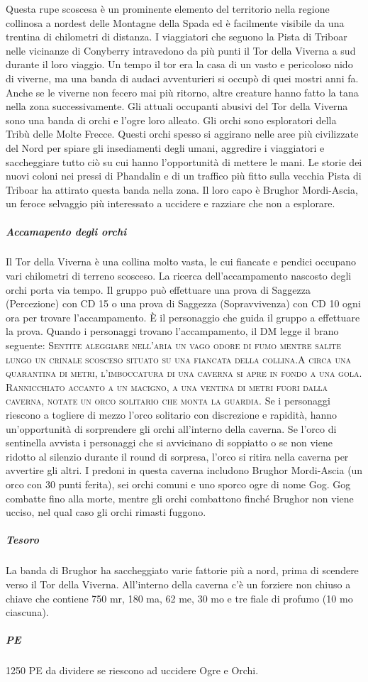 \documentclass{article}
\begin{document}
Questa rupe scoscesa è un prominente elemento del territorio
nella regione collinosa a nordest delle Montagne della Spada
ed è facilmente visibile da una trentina di chilometri di
distanza. I viaggiatori che seguono la Pista di Triboar nelle
vicinanze di Conyberry intravedono da più punti il Tor della
Viverna a sud durante il loro viaggio. Un tempo il tor era la
casa di un vasto e pericoloso nido di viverne, ma una banda
di audaci avventurieri si occupò di quei mostri anni fa. Anche
se le viverne non fecero mai più ritorno, altre creature hanno
fatto la tana nella zona successivamente. Gli attuali occupanti
abusivi del Tor della Viverna sono una banda di orchi e l’ogre
loro alleato.
Gli orchi sono esploratori della Tribù delle Molte Frecce.
Questi orchi spesso si aggirano nelle aree più civilizzate del
Nord per spiare gli insediamenti degli umani, aggredire i
viaggiatori e saccheggiare tutto ciò su cui hanno l'opportunità
di mettere le mani. Le storie dei nuovi coloni nei pressi di
Phandalin e di un traffico più fitto sulla vecchia Pista di
Triboar ha attirato questa banda nella zona. Il loro capo è
Brughor Mordi-Ascia, un feroce selvaggio più interessato a
uccidere e razziare che non a esplorare.

\subparagraph{Accamapento degli orchi}
Il Tor della Viverna è una collina molto vasta, le cui
fiancate e pendici occupano vari chilometri di terreno scosceso. La ricerca dell’accampamento nascosto degli
orchi porta via tempo. Il gruppo può effettuare una prova
di Saggezza (Percezione) con CD 15 o una prova di
Saggezza (Sopravvivenza) con CD 10 ogni ora per trovare
l'accampamento. È il personaggio che guida il gruppo a
effettuare la prova.
Quando i personaggi trovano l'accampamento, il DM legge
il brano seguente: \textsc{Sentite aleggiare nell’aria un vago odore di fumo mentre
salite lungo un crinale scosceso situato su una fiancata della
collina.A circa una quarantina di metri, l’imboccatura di una
caverna si apre in fondo a una gola. Rannicchiato accanto a un
macigno, a una ventina di metri fuori dalla caverna, notate un
orco solitario che monta la guardia.} 
Se i personaggi riescono a togliere di mezzo l'orco solitario
con discrezione e rapidità, hanno un'opportunità di
sorprendere gli orchi all'interno della caverna. Se l'orco di
sentinella avvista i personaggi che si avvicinano di soppiatto
o se non viene ridotto al silenzio durante il round di sorpresa,
l’orco si ritira nella caverna per avvertire gli altri.
I predoni in questa caverna includono Brughor Mordi-Ascia
(un orco con 30 punti ferita), sei orchi comuni e uno sporco
ogre di nome Gog. Gog combatte fino alla morte, mentre gli
orchi combattono finché Brughor non viene ucciso, nel qual
caso gli orchi rimasti fuggono.

\subparagraph{Tesoro} La banda di Brughor ha saccheggiato varie fattorie più a
nord, prima di scendere verso il Tor della Viverna. All'interno
della caverna c'è un forziere non chiuso a chiave che contiene
750 mr, 180 ma, 62 me, 30 mo e tre fiale di profumo (10
mo ciascuna).

\subparagraph{PE} 1250 PE da dividere se riescono ad uccidere Ogre e Orchi.


        



    
\end{document}
